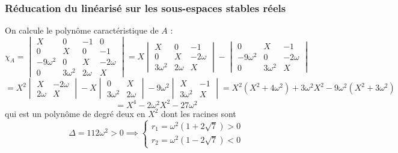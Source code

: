 \documentclass[12pt]{article}
\begin{document}
	
	\subsubsection{Réducation du linéarisé sur les sous-espaces stables réels}
	On calcule le polynôme caractéristique de $A$ :
	\begin{equation}
		\label{polynome carac de A}
		\chi_A =
		\begin{vmatrix}
			X & 0 & -1 & 0 
			\\
			0 & X & 0 & -1
			\\
			-9\omega^2 & 0 & X & - 2 \omega
			\\
			0 & 3\omega^2 & 2\omega & X
		\end{vmatrix}
		=
		X\begin{vmatrix}
			X & 0 & -1
			\\
			0 & X & - 2 \omega
			\\
			3\omega^2 & 2\omega & X
		\end{vmatrix}
		- \begin{vmatrix}
			0 & X & -1
			\\
			-9\omega^2 & 0 & - 2 \omega
			\\
			0 & 3\omega^2 & X
		\end{vmatrix}
	\end{equation}
	\begin{equation*}
		=
		X^2\begin{vmatrix}
			X & - 2 \omega
			\\
			2\omega & X
		\end{vmatrix}
		-X\begin{vmatrix}
			0 & X
			\\
			3\omega^2 & 2\omega
		\end{vmatrix}
		-9\omega^2\begin{vmatrix}
			X & -1
			\\
			3\omega^2 & X
		\end{vmatrix}
		=
		X^2(X^2+4\omega^2) + 3\omega^2X^2 - 9\omega^2(X^2+3\omega^2)
	\end{equation*}
	\begin{equation*}
		= X^4 -2\omega^2X^2 - 27\omega^2
	\end{equation*}
	qui est un polynôme de degré deux en $X^2$ dont les racines sont
	\begin{equation}
		\Delta = 112\omega^2 > 0
		\implies
		\begin{cases}
			r_1 = \omega^2(1 + 2\sqrt{7}) > 0
			\\
			r_2 = \omega^2(1 - 2\sqrt{7}) < 0
		\end{cases}
	\end{equation}
\end{document}
